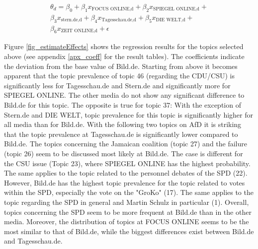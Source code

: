 \documentclass[12pt,a4paper,notitlepage]{article}
\begin{document}
\begin{equation}\label{eq_1}
\begin{split}
	\theta_{d}=\beta_0+\beta_1 x_{\text{FOCUS ONLINE,d}}+\beta_2 x_{\text{SPIEGEL ONLINE,d}}+\\
	\beta_3 x_{\text{stern.de,d}}+\beta_4 x_{\text{Tagesschau.de,d}}+\beta_5 x_{\text{DIE WELT,d}}+\\
	\beta_6 x_{\text{ZEIT ONLINE,d}}+\epsilon
\end{split}
\end{equation}

Figure \ref{fig_estimateEffects} shows the regression results for the topics selected above (see appendix \ref{apx_coeff} for the result tables). The coefficients indicate the deviation from the base value of Bild.de. Starting from above it becomes apparent that the topic prevalence of topic 46 (regarding the CDU/CSU) is significantly less for Tagesschau.de and Stern.de and significantly more for SPIEGEL ONLINE. The other media do not show any significant difference to Bild.de for this topic. The opposite is true for topic 37: With the exception of Stern.de and DIE WELT, topic prevalence for this topic is significantly higher for all media than for Bild.de. With the following two topics on AfD it is striking that the topic prevalence at Tagesschau.de is significantly lower compared to Bild.de. The topics concerning the Jamaican coalition (topic 27) and the failure (topic 26) seem to be discussed most likely at Bild.de. The case is different for the CSU issue (Topic 23), where SPIEGEL ONLINE has the highest probability. The same applies to the topic related to the personnel debates of the SPD (22). However, Bild.de has the highest topic prevalence for the topic related to votes within the SPD, especially the vote on the "GroKo" (17). The same applies to the topic regarding the SPD in general and Martin Schulz in particular (1). Overall, topics concerning the SPD seem to be more frequent at Bild.de than in the other media. Moreover, the distribution of topics at FOCUS ONLINE seems to be the most similar to that of Bild.de, while the biggest differences exist between Bild.de and Tagesschau.de. 
\end{document}
